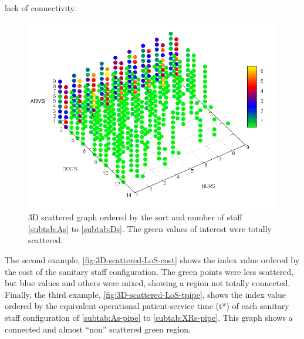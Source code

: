 lack of connectivity. 
\begin{figure}[H]
\noindent \centering{}\includegraphics[width=0.88\columnwidth,height=0.2\paperheight]{figs4/3D-scatter-LoS-wo2}\caption{3D scattered graph ordered by the sort and number of staff \ref{subtab:As}
to \ref{subtab:Ds}. The green values of interest were totally scattered.
\label{fig:3D-scattered-LoS-wo}}
\end{figure}
 The second example, \ref{fig:3D-scattered-LoS-cost} shows the index
value ordered by the cost of the sanitary staff configuration. The
green points were less scattered, but blue values and others were
mixed, showing a region not totally connected. Finally, the third
example, \ref{fig:3D-scattered-LoS-tpipe}, shows the index value
ordered by the equivalent operational patient-service time \foreignlanguage{american}{(t{*})}
of each sanitary staff configuration of \ref{subtab:As-pipe} to \ref{subtab:XRs-pipe}.
This graph shows a connected and almost ``non'' scattered green
region. %

